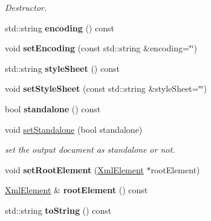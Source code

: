 \begin{DoxyCompactItemize}
\begin{DoxyCompactList}\small\item\em Destructor. \end{DoxyCompactList}\item 
\hypertarget{class_xml_document_a5063b9dc310ed5ed7a38b77f8584a50c}{std\+::string {\bfseries encoding} () const }\label{class_xml_document_a5063b9dc310ed5ed7a38b77f8584a50c}

\item 
\hypertarget{class_xml_document_afb4401e77f67626533ba7409a011c508}{void {\bfseries set\+Encoding} (const std\+::string \&encoding=\char`\"{}\char`\"{})}\label{class_xml_document_afb4401e77f67626533ba7409a011c508}

\item 
\hypertarget{class_xml_document_ae0a7e5e1f28b179c31bee66481b18c03}{std\+::string {\bfseries style\+Sheet} () const }\label{class_xml_document_ae0a7e5e1f28b179c31bee66481b18c03}

\item 
\hypertarget{class_xml_document_a63cfdd276a9812900cd7739758effd78}{void {\bfseries set\+Style\+Sheet} (const std\+::string \&style\+Sheet=\char`\"{}\char`\"{})}\label{class_xml_document_a63cfdd276a9812900cd7739758effd78}

\item 
\hypertarget{class_xml_document_ab3ff5eb5c5df20453b4fc6f5b9bcff6e}{bool {\bfseries standalone} () const }\label{class_xml_document_ab3ff5eb5c5df20453b4fc6f5b9bcff6e}

\item 
void \hyperlink{class_xml_document_a3cc9d3452daba0bda758ee7add075827}{set\+Standalone} (bool standalone)
\begin{DoxyCompactList}\small\item\em set the output document as standalone or not. \end{DoxyCompactList}\item 
\hypertarget{class_xml_document_a2b419770905e48914ed6dba3990061cd}{void {\bfseries set\+Root\+Element} (\hyperlink{class_xml_element}{Xml\+Element} $\ast$root\+Element)}\label{class_xml_document_a2b419770905e48914ed6dba3990061cd}

\item 
\hypertarget{class_xml_document_a87f0ea5104985af47f6a2aea5517aeb9}{\hyperlink{class_xml_element}{Xml\+Element} \& {\bfseries root\+Element} () const }\label{class_xml_document_a87f0ea5104985af47f6a2aea5517aeb9}

\item 
\hypertarget{class_xml_document_aa75e20c19ee0719af2e5b573db02f5a4}{std\+::string {\bfseries to\+String} () const }\label{class_xml_document_aa75e20c19ee0719af2e5b573db02f5a4}

\end{DoxyCompactItemize}
